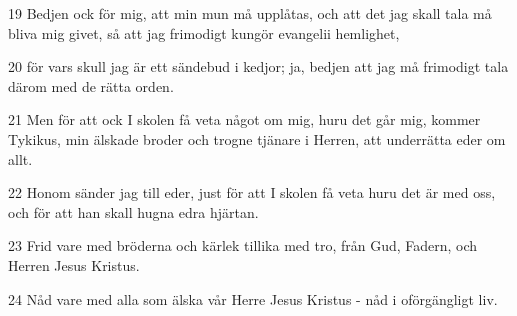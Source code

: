 \par 19 Bedjen ock för mig, att min mun må upplåtas, och att det jag skall tala må bliva mig givet, så att jag frimodigt kungör evangelii hemlighet,
\par 20 för vars skull jag är ett sändebud i kedjor; ja, bedjen att jag må frimodigt tala därom med de rätta orden.
\par 21 Men för att ock I skolen få veta något om mig, huru det går mig, kommer Tykikus, min älskade broder och trogne tjänare i Herren, att underrätta eder om allt.
\par 22 Honom sänder jag till eder, just för att I skolen få veta huru det är med oss, och för att han skall hugna edra hjärtan.
\par 23 Frid vare med bröderna och kärlek tillika med tro, från Gud, Fadern, och Herren Jesus Kristus.
\par 24 Nåd vare med alla som älska vår Herre Jesus Kristus - nåd i oförgängligt liv.


